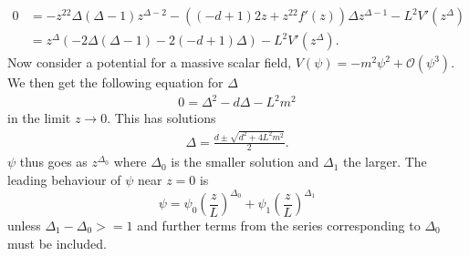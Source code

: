 \documentclass[12pt]{report}
\begin{document}
\begin{appendices}
\begin{equation}
\begin{split}
0&=-z^22\Delta(\Delta-1)z^{\Delta-2}-\left((-d+1)2z + z^22f'(z)\right)\Delta z^{\Delta-1} -L^2V'(z^{\Delta})\\
&=z^{\Delta}\left(-2\Delta(\Delta-1)-2(-d+1)\Delta\right)-L^2V'(z^{\Delta}).
\end{split}
\end{equation}
Now consider a potential for a massive scalar field, $V(\psi)=-m^2\psi^2+\mathcal{O}(\psi^3)$. We then get the following equation for $\Delta$
\begin{equation}
\begin{split}
0=\Delta^2-d\Delta-L^2m^2
\end{split}
\end{equation}
in the limit $z\rightarrow0$. This has solutions
\begin{equation}
\begin{split}
\Delta=\frac{d\pm\sqrt{d^2+4L^2m^2}}{2}.
\end{split}
\end{equation}
$\psi$ thus goes as $z^{\Delta_0}$ where $\Delta_0$ is the smaller solution and $\Delta_1$ the larger. The leading behaviour of $\psi$ near $z=0$ is
\begin{equation}
 \psi=\psi_0\left(\frac{z}{L}\right)^{\Delta_0}+\psi_1\left(\frac{z}{L}\right)^{\Delta_1}
\end{equation}
unless $\Delta_1-\Delta_0>=1$ and further terms from the series corresponding to $\Delta_0$ must be included.\\


\end{appendices}
\end{document}
